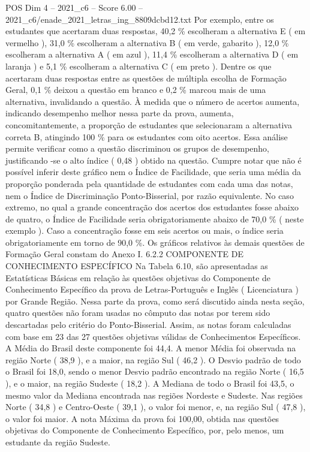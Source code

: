 \begin{textsample}{POS Dim 4 – 2021\_c6 – Score 6.00 – 2021\_c6/enade\_2021\_letras\_ing\_8809dcbd12.txt}
Por exemplo, entre os estudantes que acertaram duas respostas, 40,2 \% escolheram a alternativa E ( em vermelho ), 31,0 \% escolheram a alternativa B ( em verde, gabarito ), 12,0 \% escolheram a alternativa A ( em azul ), 11,4 \% escolheram a alternativa D ( em laranja ) e 5,1 \% escolheram a alternativa C ( em preto ).
Dentre os que acertaram duas respostas entre as questões de múltipla escolha de Formação Geral, 0,1 \% deixou a questão em branco e 0,2 \% marcou mais de uma alternativa, invalidando a questão.
À medida que o número de acertos aumenta, indicando desempenho melhor nessa parte da prova, aumenta, concomitantemente, a proporção de estudantes que selecionaram a alternativa correta B, atingindo 100 \% para os estudantes com oito acertos.
Essa análise permite verificar como a questão discriminou os grupos de desempenho, justificando -se o alto índice ( 0,48 ) obtido na questão.
Cumpre notar que não é possível inferir deste gráfico nem o Índice de Facilidade, que seria uma média da proporção ponderada pela quantidade de estudantes com cada uma das notas, nem o Índice de Discriminação Ponto-Bisserial, por razão equivalente.
No caso extremo, no qual a grande concentração dos acertos dos estudantes fosse abaixo de quatro, o Índice de Facilidade seria obrigatoriamente abaixo de 70,0 \% ( neste exemplo ).
Caso a concentração fosse em seis acertos ou mais, o índice seria obrigatoriamente em torno de 90,0 \%.
Os gráficos relativos às demais questões de Formação Geral constam do Anexo I. 6.2.2 COMPONENTE DE CONHECIMENTO ESPECÍFICO Na Tabela 6.10, são apresentadas as Estatísticas Básicas em relação às questões objetivas do Componente de Conhecimento Específico da prova de Letras-Português e Inglês ( Licenciatura ) por Grande Região.
Nessa parte da prova, como será discutido ainda nesta seção, quatro questões não foram usadas no cômputo das notas por terem sido descartadas pelo critério do Ponto-Bisserial.
Assim, as notas foram calculadas com base em 23 das 27 questões objetivas válidas de Conhecimentos Específicos.
A Média do Brasil deste componente foi 44,4.
A menor Média foi observada na região Norte ( 38,9 ), e a maior, na região Sul ( 46,2 ).
O Desvio padrão de todo o Brasil foi 18,0, sendo o menor Desvio padrão encontrado na região Norte ( 16,5 ), e o maior, na região Sudeste ( 18,2 ).
A Mediana de todo o Brasil foi 43,5, o mesmo valor da Mediana encontrada nas regiões Nordeste e Sudeste.
Nas regiões Norte ( 34,8 ) e Centro-Oeste ( 39,1 ), o valor foi menor, e, na região Sul ( 47,8 ), o valor foi maior.
A nota Máxima da prova foi 100,00, obtida nas questões objetivas do Componente de Conhecimento Específico, por, pelo menos, um estudante da região Sudeste.

\end{textsample}
